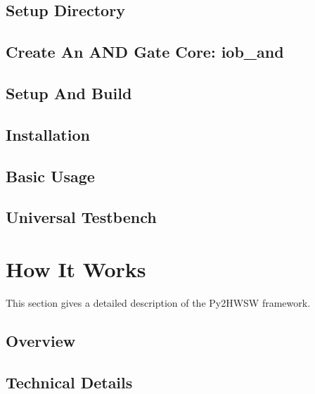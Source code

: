 \documentclass{ug}
\begin{document}
\subsection{Setup Directory}
\label{sec:setup_dir}


\subsection{Create An AND Gate Core: iob\_and}
\label{sec:iob_and}


\subsection{Setup And Build}
\label{sec:setup_build}


\subsection{Installation}
\label{sec:installation}


\subsection{Basic Usage}
\label{sec:basic_usage}


\subsection{Universal Testbench}
\label{sec:utb}


%
%
\ifdefined\SECTIONCLEARPAGE
\clearpage
\fi
\section{How It Works}
\label{sec:how_it_works}

This section gives a detailed description of the Py2HWSW framework.

\subsection{Overview}
\label{sec:py2_overview}


\subsection{Technical Details}
\label{sec:py2_technical_details}

\end{document}
